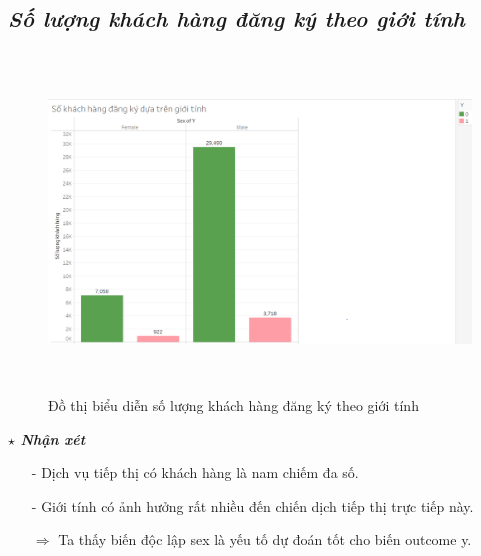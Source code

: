 \documentclass{report}
\begin{document}
\subsection{\textit{Số lượng khách hàng đăng ký theo giới tính}}
         \begin{center}
        \begin{figure}[htp]
    	\begin{center}
    		\includegraphics[width=15cm, height=9cm]{images/hinh9.png}
    	\end{center}
    		\caption{Đồ thị biểu diễn số lượng khách hàng đăng ký theo giới tính}
    \end{figure}
    \end{center}
    \fontsize{13}{14}\selectfont \textbf{$\star$\textit{ Nhận xét}}
    \begin{enumerate}
        \item[- ] Dịch vụ tiếp thị có khách hàng là nam chiếm đa số.
        \item[- ] Giới tính có ảnh hưởng rất nhiều đến chiến dịch tiếp thị trực tiếp này.
        \item [$\Rightarrow$] Ta thấy biến độc lập sex là yếu tố dự đoán tốt cho biến outcome y.
    \end{enumerate}
\pagebreak
\end{document}
